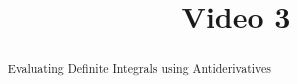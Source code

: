 \documentclass[handout]{ximera}
\title{Video 3}
\begin{document}
\begin{abstract}
Evaluating Definite Integrals using Antiderivatives
\end{abstract}

\maketitle

\end{document}
